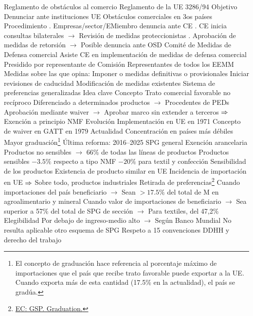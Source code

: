 \documentclass{nuevotema}
\begin{document}
\begin{esquemal}
			\3 Reglamento de obstáculos al comercio
				\4 Reglamento de la UE 3286/94
				\4 Objetivo
				\4[] Denunciar ante instituciones UE
				\4[] Obstáculos comerciales en 3os países
				\4 Procedimiento
				. Empresas/sector/EMiembro denuncia ante CE
				. CE inicia consultas bilaterales
				\4[] $\to$ Revisión de medidas proteccionistas
				. Aprobación de medidas de retorsión
				\4[] $\to$ Posible denuncia ante OSD
			\3 Comité de Medidas de Defensa comercial
				\4 Asiste CE en implementación de medidas de defensa comercial
				\4 Presidido por representante de Comisión
				\4 Representantes de todos los EEMM
				\4 Medidas sobre las que opina:
				\4[] Imponer o medidas definitivas o provisionales
				\4[] Iniciar revisiones de caducidad
				\4[] Modificación de medidas existentes
		\2 Sistema de preferencias generalizadas
			\3 Idea clave
				\4 Concepto
				\4[] Trato comercial favorable no recíproco
				\4[] Diferenciado a determinados productos
				\4[] $\to$ Procedentes de PEDs
				\4[] Aprobación mediante waiver
				\4[] $\to$ Aprobar marco sin extender a terceros
				\4[] $\Rightarrow$ Exención a principio NMF
				\4 Evolución
				\4[] Implementación en UE en 1971
				\4[] Concepto de waiver en GATT en 1979
				\4 Actualidad
				\4[] Concentración en países más débiles
				\4[] Mayor graduación\footnote{El concepto de graduación hace referencia al porcentaje máximo de importaciones que el país que recibe trato favorable puede exportar a la UE. Cuando exporta más de esta cantidad (17.5\% en la actualidad), el país se gradúa.}
				\4[] Última reforma: 2016--2025
			\3 SPG general
				\4 Exención arancelaria
				\4[] Productos no sensibles
				\4[] $\to$ 66\% de todas las líneas de productos
				\4 Productos sensibles
				\4[] $-3.5\%$ respecto a tipo NMF
				\4[] $-20\%$ para textil y confección
				\4 Sensibilidad de los productos
				\4[] Existencia de producto similar en UE
				\4[] Incidencia de importación en UE
				\4[] $\Rightarrow$ Sobre todo, productos industriales
				\4 Retirada de preferencias\footnote{\href{https://trade.ec.europa.eu/tradehelp/standard-gsp}{EC: GSP. Graduation.}}
				\4[] Cuando importaciones del país beneficiario
				\4[] $\to$ Sean $>17.5\%$ del total de M en agroalimentario y mineral
				\4[] Cuando valor de importaciones de beneficiario
				\4[] $\to$ Sea superior a 57\% del total de SPG de sección
				\4[] $\to$ Para textiles, del 47,2\%
				\4 Elegibilidad
				\4[] Por debajo de ingreso-medio alto
				\4[] $\to$ Según Banco Mundial
				\4[] No resulta aplicable otro esquema de SPG
				\4[] Respeto a 15 convenciones DDHH y derecho del trabajo

\end{esquemal}
\end{document}
